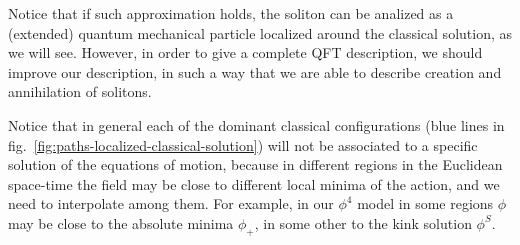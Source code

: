 \documentclass[../main/main.tex]{subfiles}
\begin{document}
Notice that if such approximation holds, the soliton can be analized as a (extended) quantum mechanical particle localized around the classical solution, as we will see. However, in order to give a complete QFT description, we should improve our description, in such a way that we are able to describe creation and annihilation of solitons. 

\skipline

Notice that in general each of the dominant classical configurations (blue lines in fig.~\ref{fig:paths-localized-classical-solution}) will not be associated to a specific solution of the equations of motion, because in different regions in the Euclidean space-time the field may be close to different local minima of the action, and we need to interpolate among them. For example, in our $\phi^4$ model in some regions $\phi$ may be close to the absolute minima $\phi_+$, in some other to the kink solution $\phi^S$. 
\end{document}
